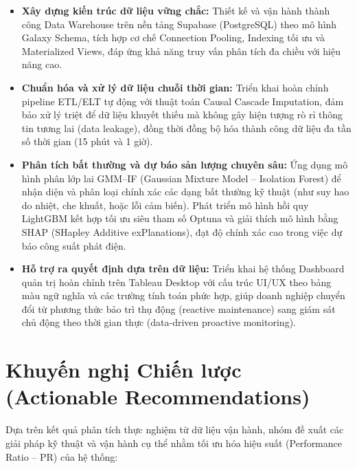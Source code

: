 \documentclass[12pt, a4paper]{report}
\begin{document}
\begin{itemize}
    \item \textbf{Xây dựng kiến trúc dữ liệu vững chắc:} Thiết kế và vận hành thành công Data Warehouse trên nền tảng Supabase (PostgreSQL) theo mô hình Galaxy Schema, tích hợp cơ chế Connection Pooling, Indexing tối ưu và Materialized Views, đáp ứng khả năng truy vấn phân tích đa chiều với hiệu năng cao.
    \item \textbf{Chuẩn hóa và xử lý dữ liệu chuỗi thời gian:} Triển khai hoàn chỉnh pipeline ETL/ELT tự động với thuật toán Causal Cascade Imputation, đảm bảo xử lý triệt để dữ liệu khuyết thiếu mà không gây hiện tượng rò rỉ thông tin tương lai (data leakage), đồng thời đồng bộ hóa thành công dữ liệu đa tần số thời gian (15 phút và 1 giờ).
    \item \textbf{Phân tích bất thường và dự báo sản lượng chuyên sâu:} Ứng dụng mô hình phân lớp lai GMM--IF (Gaussian Mixture Model -- Isolation Forest) để nhận diện và phân loại chính xác các dạng bất thường kỹ thuật (như suy hao do nhiệt, che khuất, hoặc lỗi cảm biến). Phát triển mô hình hồi quy LightGBM kết hợp tối ưu siêu tham số Optuna và giải thích mô hình bằng SHAP (SHapley Additive exPlanations), đạt độ chính xác cao trong việc dự báo công suất phát điện.
    \item \textbf{Hỗ trợ ra quyết định dựa trên dữ liệu:} Triển khai hệ thống Dashboard quản trị hoàn chỉnh trên Tableau Desktop với cấu trúc UI/UX theo bảng màu ngữ nghĩa và các trường tính toán phức hợp, giúp doanh nghiệp chuyển đổi từ phương thức bảo trì thụ động (reactive maintenance) sang giám sát chủ động theo thời gian thực (data-driven proactive monitoring).
\end{itemize}

\section{Khuyến nghị Chiến lược (Actionable Recommendations)}
\label{sec:recommendations}
Dựa trên kết quả phân tích thực nghiệm từ dữ liệu vận hành, nhóm đề xuất các giải pháp kỹ thuật và vận hành cụ thể nhằm tối ưu hóa hiệu suất (Performance Ratio -- PR) của hệ thống:
\end{document}
